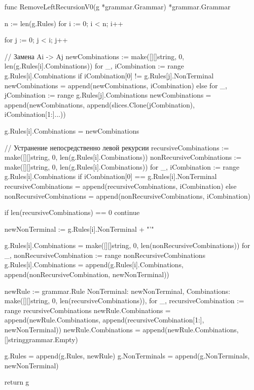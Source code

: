 func RemoveLeftRecursionV0(g *grammar.Grammar) *grammar.Grammar {
	n := len(g.Rules)
	for i := 0; i < n; i++ {
		for j := 0; j < i; j++ {
			// Замена Ai -> Aj
			newCombinations := make([][]string, 0, len(g.Rules[i].Combinations))
			for _, iCombination := range g.Rules[i].Combinations {
				if iCombination[0] != g.Rules[j].NonTerminal {
					newCombinations = append(newCombinations, iCombination)
				} else {
					for _, jCombination := range g.Rules[j].Combinations {
						newCombinations = append(newCombinations, append(slices.Clone(jCombination), iCombination[1:]...))
					}
				}
			}

			g.Rules[i].Combinations = newCombinations
		}

		// Устранение непосредственно левой рекурсии
		recursiveCombinations := make([][]string, 0, len(g.Rules[i].Combinations))
		nonRecursiveCombinations := make([][]string, 0, len(g.Rules[i].Combinations))
		for _, iCombination := range g.Rules[i].Combinations {
			if iCombination[0] == g.Rules[i].NonTerminal {
				recursiveCombinations = append(recursiveCombinations, iCombination)
			} else {
				nonRecursiveCombinations = append(nonRecursiveCombinations, iCombination)
			}
		}

		if len(recursiveCombinations) == 0 {
			continue
		}

		newNonTerminal := g.Rules[i].NonTerminal + "'"

		g.Rules[i].Combinations = make([][]string, 0, len(nonRecursiveCombinations))
		for _, nonRecursiveCombination := range nonRecursiveCombinations {
			g.Rules[i].Combinations = append(g.Rules[i].Combinations, append(nonRecursiveCombination, newNonTerminal))
		}

		newRule := grammar.Rule{
			NonTerminal:  newNonTerminal,
			Combinations: make([][]string, 0, len(recursiveCombinations)),
		}
		for _, recursiveCombination := range recursiveCombinations {
			newRule.Combinations = append(newRule.Combinations, append(recursiveCombination[1:], newNonTerminal))
		}
		newRule.Combinations = append(newRule.Combinations, []string{grammar.Empty})

		g.Rules = append(g.Rules, newRule)
		g.NonTerminals = append(g.NonTerminals, newNonTerminal)
	}

	return g
}


